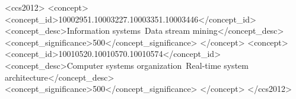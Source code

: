 %
%
\begin{CCSXML}
	<ccs2012>
	<concept>
	<concept_id>10002951.10003227.10003351.10003446</concept_id>
	<concept_desc>Information systems~Data stream mining</concept_desc>
	<concept_significance>500</concept_significance>
	</concept>
	<concept>
	<concept_id>10010520.10010570.10010574</concept_id>
	<concept_desc>Computer systems organization~Real-time system architecture</concept_desc>
	<concept_significance>500</concept_significance>
	</concept>
	</ccs2012>
\end{CCSXML}


\printccsdesc


